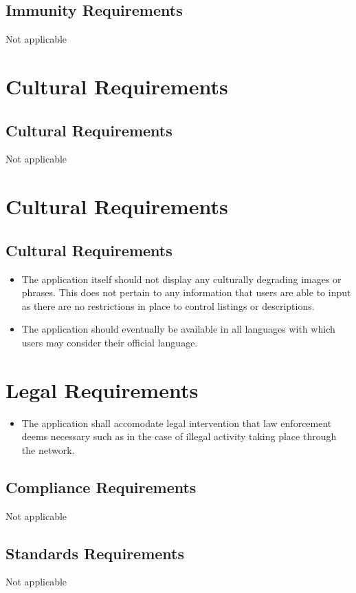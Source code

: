 \documentclass{article}
\begin{document}
\subsection{Immunity Requirements}
Not applicable

\section{Cultural Requirements}
\subsection{Cultural Requirements}
Not applicable


\section{Cultural Requirements}
\subsection{Cultural Requirements}
\begin{itemize}
\item
The application itself should not display any culturally degrading images or phrases. This does not pertain to any information that users are able to input as there are no restrictions in place to control listings or descriptions. 
\item
The application should eventually be available in all languages with which users may consider their official language.
\end{itemize}

\section{Legal Requirements}
\begin{itemize}
\item
The application shall accomodate legal intervention that law enforcement deems necessary such as in the case of illegal activity taking place through the network. 
\end{itemize}

\subsection{Compliance Requirements}
Not applicable

\subsection{Standards Requirements}
Not applicable
\end{document}

